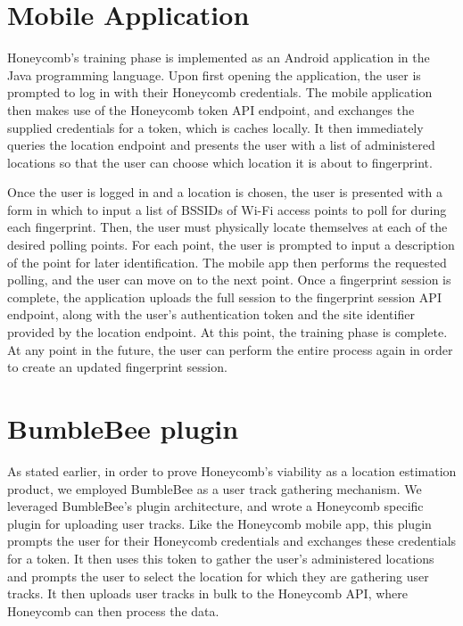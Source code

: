 \section{Mobile Application}
%

Honeycomb's training phase is implemented as an Android application in the Java programming language. Upon first opening the application, the user is prompted to log in with their Honeycomb credentials. The mobile application then makes use of the Honeycomb token API endpoint, and exchanges the supplied credentials for a token, which is caches locally. It then immediately queries the location endpoint and presents the user with a list of administered locations so that the user can choose which location it is about to fingerprint. 

Once the user is logged in and a location is chosen, the user is presented with a form in which to input a list of BSSIDs of Wi-Fi access points to poll for during each fingerprint. Then, the user must physically locate themselves at each of the desired polling points. For each point, the user is prompted to input a description of the point for later identification. The mobile app then performs the requested polling, and the user can move on to the next point. Once a fingerprint session is complete, the application uploads the full session to the fingerprint session API endpoint, along with the user's authentication token and the site identifier provided by the location endpoint. At this point, the training phase is complete. At any point in the future, the user can perform the entire process again in order to create an updated fingerprint session.


\section{BumbleBee plugin}
%


As stated earlier, in order to prove Honeycomb's viability as a location estimation product, we employed BumbleBee as a user track gathering mechanism. We leveraged BumbleBee's plugin architecture, and wrote a Honeycomb specific plugin for uploading user tracks. Like the Honeycomb mobile app, this plugin prompts the user for their Honeycomb credentials and exchanges these credentials for a token. It then uses this token to gather the user's administered locations and prompts the user to select the location for which they are gathering user tracks. It then uploads user tracks in bulk to the Honeycomb API, where Honeycomb can then process the data.